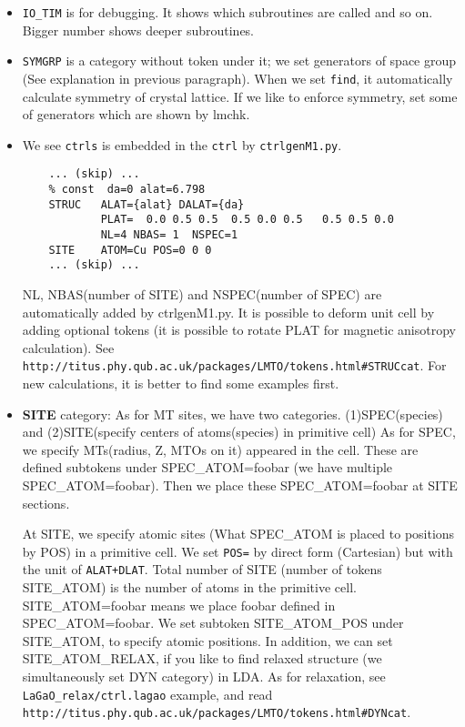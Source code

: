 \documentclass[a4paper,10pt,epsf,fleqn]{article}
\begin{document}
\begin{itemize}
\item
\verb+IO_TIM+ is for debugging. It shows which subroutines are
called and so on. Bigger number shows deeper subroutines.

\item
\verb+SYMGRP+ is a category without token under it; 
we set generators of space group (See explanation in previous paragraph).
When we set \verb+find+, it automatically calculate symmetry of crystal lattice.
If we like to enforce symmetry, set some of generators which are shown by lmchk.

\item
We see \verb+ctrls+ is embedded in the \verb+ctrl+ by \verb+ctrlgenM1.py+.
\begin{verbatim}
    ... (skip) ...
    % const  da=0 alat=6.798
    STRUC   ALAT={alat} DALAT={da}
            PLAT=  0.0 0.5 0.5  0.5 0.0 0.5   0.5 0.5 0.0
            NL=4 NBAS= 1  NSPEC=1
    SITE    ATOM=Cu POS=0 0 0
    ... (skip) ...
\end{verbatim}
NL, NBAS(number of SITE) and NSPEC(number of SPEC) are automatically
added by ctrlgenM1.py.
It is possible to deform unit cell by adding optional tokens
(it is possible to rotate PLAT for magnetic anisotropy calculation).
See \verb+http://titus.phy.qub.ac.uk/packages/LMTO/tokens.html#STRUCcat+.
For new calculations, it is better to find some examples first.

\item
{\bf SITE} category:
As for MT sites, we have two categories.
(1)SPEC(species) and (2)SITE(specify centers of atoms(species) in primitive cell)
As for SPEC, we specify MTs(radius, Z, MTOs on it) appeared in the cell.
These are defined subtokens under SPEC\_ATOM=foobar (we have multiple SPEC\_ATOM=foobar).
Then we place these SPEC\_ATOM=foobar at SITE sections.

At SITE, we specify atomic sites 
(What SPEC\_ATOM is placed to positions by POS) in a primitive cell.
We set \verb+POS=+ by direct form (Cartesian) but with the unit of \verb$ALAT+DLAT$.
Total number of SITE (number of tokens SITE\_ATOM) is
the number of atoms in the primitive cell.
SITE\_ATOM=foobar means we place foobar defined in SPEC\_ATOM=foobar.
We set subtoken SITE\_ATOM\_POS under SITE\_ATOM, to specify atomic positions.
In addition, we can set SITE\_ATOM\_RELAX, if you like to find relaxed
structure (we simultaneously set DYN category) in LDA. As for
relaxation, see \verb+LaGaO_relax/ctrl.lagao+
example, and read\\ \verb+http://titus.phy.qub.ac.uk/packages/LMTO/tokens.html#DYNcat+.\\


\end{itemize}
\end{document}
